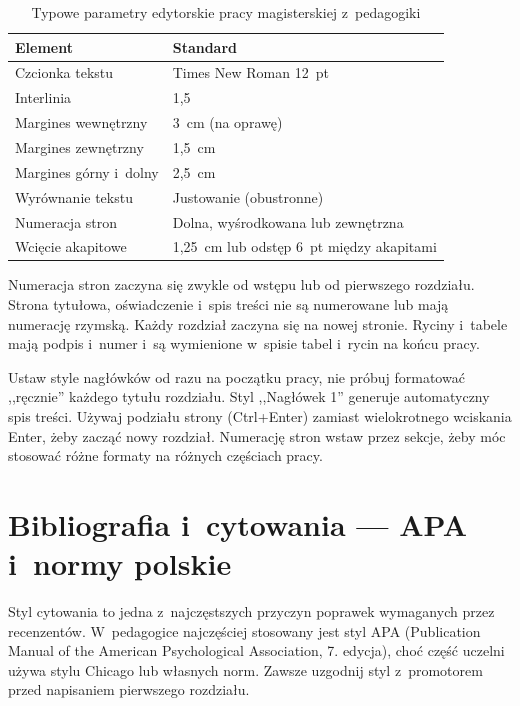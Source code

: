 \documentclass[11pt,a5paper,twoside,openany]{book}
\let\bforigsection\section
\renewcommand{\section}{\needspace{4\baselineskip}\bforigsection}
\begin{document}
\begin{table}[ht]
\centering
\caption{Typowe parametry edytorskie pracy magisterskiej z~pedagogiki}
\begin{tabularx}{\textwidth}{lX}
\toprule
\rowcolor{tableheadbg} \textcolor{tableheadfg}{\textbf{Element}} & \textcolor{tableheadfg}{\textbf{Standard}} \\
\midrule
Czcionka tekstu & Times New Roman 12~pt \\
Interlinia & 1,5 \\
Margines wewnętrzny & 3~cm (na oprawę) \\
Margines zewnętrzny & 1,5~cm \\
Margines górny i~dolny & 2,5~cm \\
Wyrównanie tekstu & Justowanie (obustronne) \\
Numeracja stron & Dolna, wyśrodkowana lub zewnętrzna \\
Wcięcie akapitowe & 1,25~cm lub odstęp 6~pt między akapitami \\
\bottomrule
\end{tabularx}
\end{table}

Numeracja stron zaczyna się zwykle od wstępu lub od pierwszego rozdziału. Strona tytułowa, oświadczenie i~spis treści nie są numerowane lub mają numerację rzymską. Każdy rozdział zaczyna się na nowej stronie. Ryciny i~tabele mają podpis i~numer i~są wymienione w~spisie tabel i~rycin na końcu pracy.

\begin{tipbox}
Ustaw style nagłówków od razu na początku pracy, nie próbuj formatować ,,ręcznie'' każdego tytułu rozdziału. Styl ,,Nagłówek 1'' generuje automatyczny spis treści. Używaj podziału strony (Ctrl+Enter) zamiast wielokrotnego wciskania Enter, żeby zacząć nowy rozdział. Numerację stron wstaw przez sekcje, żeby móc stosować różne formaty na różnych częściach pracy.
\end{tipbox}

\section{Bibliografia i~cytowania --- APA i~normy polskie}

Styl cytowania to jedna z~najczęstszych przyczyn poprawek wymaganych przez recenzentów. W~pedagogice najczęściej stosowany jest styl APA (Publication Manual of the American Psychological Association, 7. edycja), choć część uczelni używa stylu Chicago lub własnych norm. Zawsze uzgodnij styl z~promotorem przed napisaniem pierwszego rozdziału.
\end{document}
